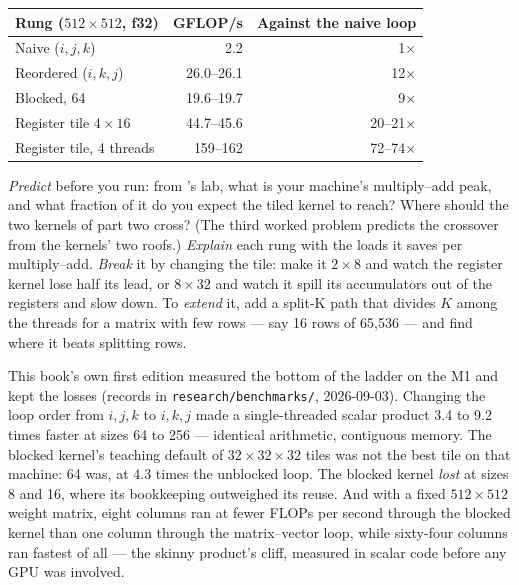 \begin{center}\small
\begin{tabular}{@{}lrr@{}}
\toprule
Rung ($512 \times 512$, f32) & GFLOP/s & Against the naive loop \\
\midrule
Naive ($i,j,k$) & 2.2 & 1$\times$ \\
Reordered ($i,k,j$) & 26.0--26.1 & 12$\times$ \\
Blocked, 64 & 19.6--19.7 & 9$\times$ \\
Register tile $4 \times 16$ & 44.7--45.6 & 20--21$\times$ \\
Register tile, 4 threads & 159--162 & 72--74$\times$ \\
\bottomrule
\end{tabular}
\end{center}

\noindent \emph{Predict} before you run: from 's lab, what is your
machine's multiply--add peak, and what fraction of it do you expect the tiled
kernel to reach? Where should the two kernels of part two cross? (The third worked
problem predicts the crossover from the kernels' two roofs.) \emph{Explain} each
rung with the loads it saves per multiply--add. \emph{Break} it by changing the
tile: make it $2 \times 8$ and watch the register kernel lose half its lead, or
$8 \times 32$ and watch it spill its accumulators out of the registers and slow
down. To \emph{extend} it, add a split-K path that divides $K$ among the threads
for a matrix with few rows --- say 16 rows of 65,536 --- and find where it beats
splitting rows.


This book's own first edition measured the bottom of the ladder on the M1 and
kept the losses (records in \texttt{research/benchmarks/}, 2026-09-03). Changing
the loop order from $i,j,k$ to $i,k,j$ made a single-threaded scalar product
3.4 to 9.2 times faster at sizes 64 to 256 --- identical arithmetic, contiguous
memory. The blocked kernel's teaching default of $32\times32\times32$ tiles was
not the best tile on that machine: 64 was, at 4.3 times the unblocked loop. The
blocked kernel \emph{lost} at sizes 8 and 16, where its bookkeeping outweighed
its reuse. And with a fixed $512\times512$ weight matrix, eight columns ran at
fewer FLOPs per second through the blocked kernel than one column through the
matrix--vector loop, while sixty-four columns ran fastest of all --- the skinny
product's cliff, measured in scalar code before any GPU was involved.

